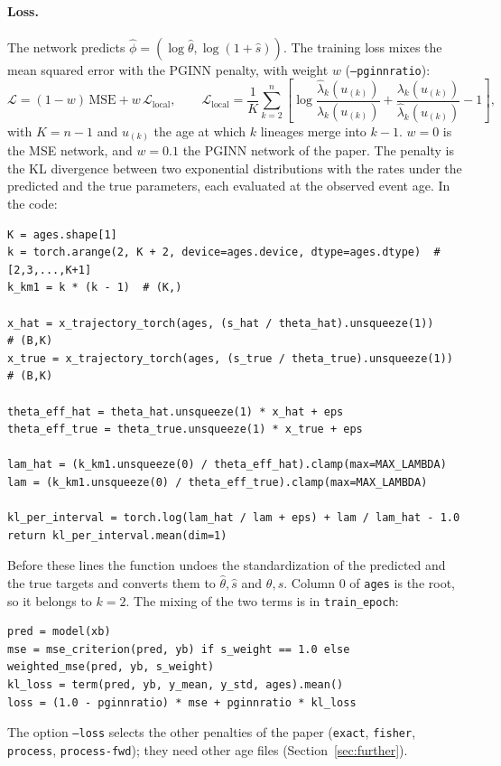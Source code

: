 \documentclass[11pt]{article}
\newcommand{\file}[1]{\texttt{#1}}
\newcommand{\pginn}{PGINN\xspace}
\begin{document}
\paragraph{Loss.}
The network predicts $\hat\phi{=}(\log\hat\theta,\log(1{+}\hat s))$.
The training loss mixes the mean squared error with the \pginn penalty,
with weight $w$ (\texttt{--pginnratio}):
\begin{equation}
\mathcal{L} = (1-w)\,\text{MSE} + w\,\mathcal{L}_{\text{local}},
\qquad
\mathcal{L}_{\text{local}} =
\frac{1}{K}\sum_{k=2}^{n}
\left[
\log\frac{\hat\lambda_k(u_{(k)})}{\lambda_k(u_{(k)})} + \frac{\lambda_k(u_{(k)})}{\hat\lambda_k(u_{(k)})} - 1
\right],
\label{eq:loss}
\end{equation}
with $K{=}n{-}1$ and $u_{(k)}$ the age at which $k$ lineages merge into
$k{-}1$.
$w{=}0$ is the MSE network, and $w{=}0.1$ the \pginn network of the paper.
The penalty is the KL divergence between two exponential distributions
with the rates under the predicted and the true parameters, each
evaluated at the observed event age. In the code:
\begin{lstlisting}[style=py, title={\file{../code/train\_pginn.py}, \texttt{coalescent\_kl\_selection} (core lines)}]
K = ages.shape[1]
k = torch.arange(2, K + 2, device=ages.device, dtype=ages.dtype)  # [2,3,...,K+1]
k_km1 = k * (k - 1)  # (K,)

x_hat = x_trajectory_torch(ages, (s_hat / theta_hat).unsqueeze(1))     # (B,K)
x_true = x_trajectory_torch(ages, (s_true / theta_true).unsqueeze(1))  # (B,K)

theta_eff_hat = theta_hat.unsqueeze(1) * x_hat + eps
theta_eff_true = theta_true.unsqueeze(1) * x_true + eps

lam_hat = (k_km1.unsqueeze(0) / theta_eff_hat).clamp(max=MAX_LAMBDA)
lam = (k_km1.unsqueeze(0) / theta_eff_true).clamp(max=MAX_LAMBDA)

kl_per_interval = torch.log(lam_hat / lam + eps) + lam / lam_hat - 1.0
return kl_per_interval.mean(dim=1)
\end{lstlisting}
Before these lines the function undoes the standardization of the
predicted and the true targets and converts them to $\hat\theta,\hat s$
and $\theta,s$.
Column 0 of \texttt{ages} is the root, so it belongs to $k{=}2$.
The mixing of the two terms is in \texttt{train\_epoch}:
\begin{lstlisting}[style=py, title={\file{../code/train\_pginn.py}, \texttt{train\_epoch}}]
pred = model(xb)
mse = mse_criterion(pred, yb) if s_weight == 1.0 else weighted_mse(pred, yb, s_weight)
kl_loss = term(pred, yb, y_mean, y_std, ages).mean()
loss = (1.0 - pginnratio) * mse + pginnratio * kl_loss
\end{lstlisting}
The option \texttt{--loss} selects the other penalties of the paper
(\texttt{exact}, \texttt{fisher}, \texttt{process},
\texttt{process-fwd}); they need other age files
(Section~\ref{sec:further}).
\end{document}
